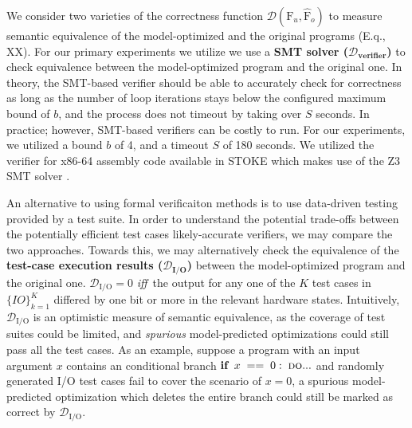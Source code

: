 \documentclass{article}
\newcommand\p{\ensuremath{{\mathrm{F}_u}}}
\def\correctfuncio/{\ensuremath{\mathcal{D}_\textrm{I/O}}}
\begin{document}
We consider two varieties of the correctness function $\mathcal{D}(\p, \hat{\mathrm{F}}_o)$ to measure semantic equivalence of the model-optimized and the original programs  (E.q., XX). 
For our primary experiments we utilize we use a \textbf{SMT solver ($\bm{\mathcal{D}_\textbf{verifier}}$)} to check equivalence between the model-optimized program and the original one. In theory, the SMT-based verifier should be able to accurately check for correctness as long as the number of loop iterations stays below the configured maximum bound of $b$, and the process does not timeout by taking over $S$ seconds. In practice; however, SMT-based verifiers can be costly to run. For our experiments, we utilized a bound $b$ of 4, and a timeout $S$ of 180 seconds.  We utilized the verifier for x86-64 assembly code available in \textsc{STOKE} which makes use of the Z3 SMT solver \cite{churchill2017sound, de2008z3}. 

An alternative to using formal verificaiton methods is to use data-driven testing provided by a test suite. In order to understand the potential trade-offs between the potentially efficient test cases likely-accurate verifiers, we may compare the two approaches. Towards this, we may alternatively check the equivalence of the \textbf{test-case execution results ({$\bm{\mathcal{D}_\textbf{I/O}}$})} between the model-optimized program and the original one. 
$\correctfuncio/=0$ \textit{iff}~the output for any one of the $K$ test cases in $\{ IO \}_{k=1}^K$ differed by one bit or more in the relevant hardware states.
Intuitively, \correctfuncio/ is an optimistic measure of semantic equivalence, as the coverage of test suites could be limited, and \emph{spurious} model-predicted optimizations could still pass all the test cases.
As an example, suppose a program with an input argument $x$ contains an conditional branch $\textbf{if} \;\; x\;==\;0:\; \textsc{do}...$ and randomly generated I/O test cases fail to cover the scenario of $x=0$, a spurious model-predicted optimization which deletes the entire branch could still be marked as correct by \correctfuncio/.
\end{document}

